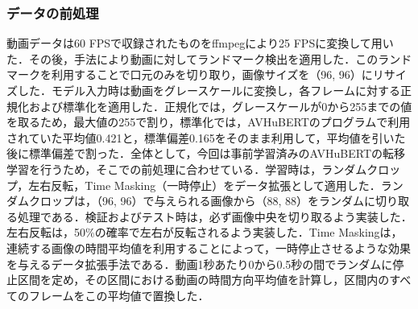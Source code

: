 \documentclass[12pt]{jarticle}
\numberwithin{equation}{section}    %
\numberwithin{figure}{section}      %
\numberwithin{table}{section}      %
\begin{document}
\begin{table}[bt]
    \centering
    \caption{利用したデータセットの文章数}
    \label{sec4:tab:dataset_info}
    \begin{center}
        \renewcommand{\arraystretch}{0.9} %
        \setlength{\tabcolsep}{8pt}      %
    \end{center}
\end{table}

\subsubsection{データの前処理}
動画データは60 FPSで収録されたものをffmpegにより25 FPSに変換して用いた．その後，手法\cite{bulat2017far}により動画に対してランドマーク検出を適用した．このランドマークを利用することで口元のみを切り取り，画像サイズを（96, 96）にリサイズした．モデル入力時は動画をグレースケールに変換し，各フレームに対する正規化および標準化を適用した．正規化では，グレースケールが0から255までの値を取るため，最大値の255で割り，標準化では，AVHuBERTのプログラムで利用されていた平均値0.421と，標準偏差0.165をそのまま利用して，平均値を引いた後に標準偏差で割った．全体として，今回は事前学習済みのAVHuBERTの転移学習を行うため，そこでの前処理に合わせている．学習時は，ランダムクロップ，左右反転，Time Masking（一時停止）をデータ拡張として適用した．ランダムクロップは，（96, 96）で与えられる画像から（88, 88）をランダムに切り取る処理である．検証およびテスト時は，必ず画像中央を切り取るよう実装した．左右反転は，50\%の確率で左右が反転されるよう実装した．Time Maskingは，連続する画像の時間平均値を利用することによって，一時停止させるような効果を与えるデータ拡張手法である．動画1秒あたり0から0.5秒の間でランダムに停止区間を定め，その区間における動画の時間方向平均値を計算し，区間内のすべてのフレームをこの平均値で置換した．
\end{document}
